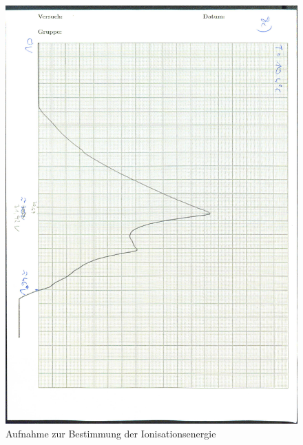 \begin{figure}[p]
  \centering
  \includegraphics[width=\textwidth]{content/Ionspannung_0001.jpg}
  \caption{Aufnahme zur Bestimmung der Ionisationsenergie}
  \label{Bild:4}
\end{figure}
